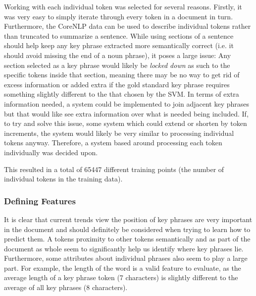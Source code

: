 Working with each individual token was selected for several reasons. Firstly, it was very easy to simply iterate through every token in a document in turn. Furthermore, the CoreNLP data can be used to describe individual tokens rather than truncated to summarize a sentence. While using sections of a sentence should help keep any key phrase extracted more semantically correct (i.e. it should avoid missing the end of a noun phrase), it poses a large issue: Any section selected as a key phrase would likely be \textit{locked down} as such to the specific tokens inside that section, meaning there may be no way to get rid of excess information or added extra if the gold standard key phrase requires something slightly different to the that chosen by the SVM. In terms of extra information needed, a system could be implemented to join adjacent key phrases but that would like see extra information over what is needed being included. If, to try and solve this issue, some system which could extend or shorten by token increments, the system would likely be very similar to processing individual tokens anyway. Therefore, a system based around processing each token individually was decided upon.

This resulted in a total of 65447 different training points (the number of individual tokens in the training data).

\subsubsection*{Defining Features}
It is clear that current trends view the position of key phrases are very important in the document and should definitely be considered when trying to learn how to predict them. A tokens proximity to other tokens semantically and as part of the document as whole seem to significantly help us identify where key phrases lie. Furthermore, some attributes about individual phrases also seem to play a large part. For example, the length of the word is a valid feature to evaluate, as the average length of a key phrase token (7 characters) is slightly different to the average of all key phrases (8 characters). 

